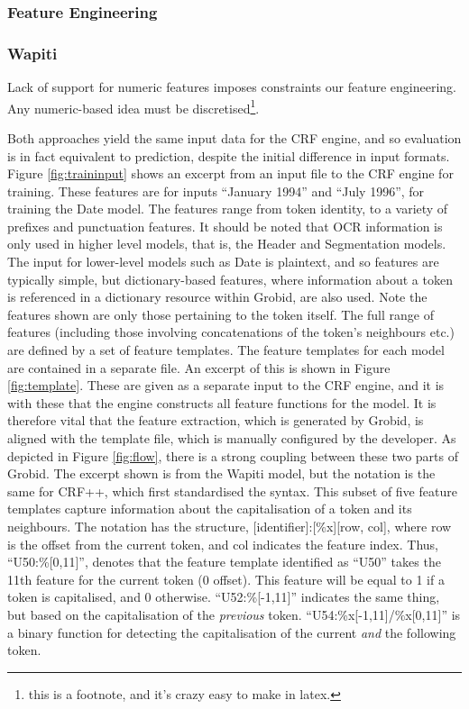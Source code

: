 \documentclass[10pt, oneside]{scrartcl}   	%
\begin{document}
\subsubsection{Feature Engineering}
\subsubsection{Wapiti}
Lack of support for numeric features imposes constraints our feature engineering. Any numeric-based idea must be discretised\footnote{this is a footnote, and it's crazy easy to make in latex.}.

Both approaches yield the same input data for the CRF engine, and so evaluation is in fact equivalent to prediction, despite the initial difference in input formats. Figure \ref{fig:traininput} shows an excerpt from an input file to the CRF engine for training. These features are for inputs ``January 1994'' and ``July 1996'', for training the Date model. The features range from token identity, to a variety of prefixes and punctuation features. It should be noted that OCR information is only used in higher level models, that is, the Header and Segmentation models. The input for lower-level models such as Date is plaintext, and so features are typically simple, but dictionary-based features, where information about a token is referenced in a dictionary resource within Grobid, are also used. Note the features shown are only those pertaining to the token itself. The full range of features (including those involving concatenations of the token's neighbours etc.) are defined by a set of feature templates. The feature templates for each model are contained in a separate file. An excerpt of this is shown in Figure \ref{fig:template}. These are given as a separate input to the CRF engine, and it is with these that the engine constructs all feature functions for the model. It is therefore vital that the feature extraction, which is generated by Grobid, is aligned with the template file, which is manually configured by the developer. As depicted in Figure \ref{fig:flow}, there is a strong coupling between these two parts of Grobid. The excerpt shown is from the Wapiti model, but the notation is the same for CRF++, which first standardised the syntax. This subset of five feature templates capture information about the capitalisation of a token and its neighbours. The notation has the structure, [identifier]:[\%x][row, col], where row is the offset from the current token, and col indicates the feature index. Thus, ``U50:\%[0,11]'', denotes that the feature template identified as ``U50'' takes the 11th feature for the current token (0 offset). This feature will be equal to 1 if a token is capitalised, and 0 otherwise. ``U52:\%[-1,11]'' indicates the same thing, but based on the capitalisation of the \emph{previous} token. ``U54:\%x[-1,11]/\%x[0,11]'' is a binary function for detecting the capitalisation of the current \emph{and} the following token.
\end{document}
